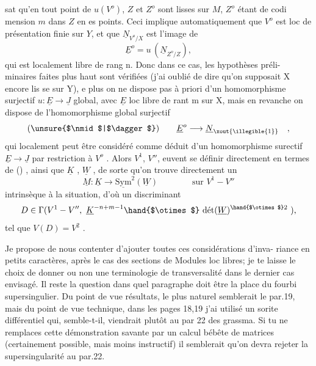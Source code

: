 
sat qu'en tout point de $u(V^{o})$, $Z$ et $Z^{o}$ sont lisses sur $M$, $Z^{o}$ étant de codi
mension $m$ dans $Z$ en es points. Ceci implique automatiquement que $V^{o}$ est
loc de présentation finie sur $Y$, et que $\underline{N}_{V^{o}/X}$ est l'image de
\[ \underline{E}^{o} = u\,(\underline{N}_{Z^{o}/Z}) , \]
qui est localement libre de rang n. Donc dans ce cas, les hypothèses préli-%
minaires faites plus haut sont vérifiées (j'ai oublié de dire qu'on supposait
X encore lis se sur Y), e plus on ne dispose pas\inserted{\unsure{,}} à priori d'un homomorphisme
surjectif $u:\underline{E}\rightarrow\underline{J}$ global, avec $\underline{E}$ loc libre de rant m sur X, mais en revanche
on dispose de l'homomorphisme global surjectif
\[ (\unsure{$\nmid$|$\dagger$}) \qquad \underline{E}^{o}\longrightarrow \underline{N}_{\xout{\illegible{1}}} \quad , \]
qui localement peut être considéré comme déduit d'un homomorphisme surectif
$\underline{E}\rightarrow\underline{J}$ par restriction à $V^{o}$ . Alors $V^{1}$, $V''$, euvent se définir directement
en termes de (\unsure{$\nmid$|$\dagger$}) , ainsi que $\underline{K}$ , $\underline{W}$ , de sorte qu'on trouve directement un
\[ \underline{M} : \underline{K}\rightarrow \underline{\mathrm{Sym}}^{2}(\underline{W}) \qquad\qquad \text{sur } V^{1}-V'' \]
intrinsèque à la situation, d'où  un discriminant
\[ D \in \Gamma(V^{1}-V'',\ \underline{K}^{-n+m-1}\hand{$\otimes$}\ \text{dét}(\underline{W})^{\hand{$\otimes$}2}\ ), \]
tel que $V(D) = V^{2}$ .

Je propose de nous contenter d'ajouter toutes ces considérations d'inva-%
riance en petits caractères, après le cas des sections de Modules loc libres;
je te laisse le choix de donner ou non une terminologie de transversalité dans
le dernier cas envisagé. Il reste la question dans quel paragraphe doit être
la place du fourbi supersingulier. Du point de vue résultats, le plus naturel
semblerait le par.19, mais du point de vue technique, dans les pages 18,19
j'ai utilisé un sorite différentiel qui, semble-t-il, viendrait plutôt au par
22 des grassma. Si tu ne remplaces cette démonstration savante par un
calcul bébête de matrices (certainement possible, mais moins instructif) il
semblerait qu'on devra rejeter la supersingularité au par.22.

